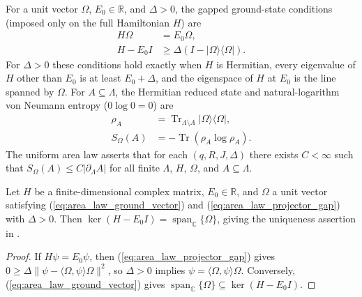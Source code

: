 \begin{definition}
    \label{def:area_law_ground_entropy}
    \leanok
    For a unit vector $\Omega$, $E_0\in\mathbb R$, and $\Delta>0$, the gapped
    ground-state conditions (imposed only on the full Hamiltonian $H$) are
    \begin{align}
        \label{eq:area_law_ground_vector}
        H\Omega & =E_0\Omega,                                \\
        \label{eq:area_law_projector_gap}
        H-E_0I  & \ge\Delta(I-|\Omega\rangle\langle\Omega|).
    \end{align}
    For $\Delta>0$ these conditions hold exactly when $H$ is Hermitian, every
    eigenvalue of $H$ other than $E_0$ is at least $E_0+\Delta$, and the
    eigenspace of $H$ at $E_0$ is the line spanned by $\Omega$.
    For $A\subseteq\Lambda$, the Hermitian reduced state and natural-logarithm
    von Neumann entropy ($0\log0=0$) are
    \begin{align}
        \label{eq:area_law_reduced_state}
        \rho_A      & =\operatorname{Tr}_{\Lambda\setminus A}|\Omega\rangle\langle\Omega|, \\
        \label{eq:area_law_regional_entropy}
        S_\Omega(A) & =-\operatorname{Tr}(\rho_A\log\rho_A).
    \end{align}
    The uniform area law asserts that for each $(q,R,J,\Delta)$ there exists
    $C<\infty$ such that $S_\Omega(A)\le C|\partial_\Lambda A|$ for all finite
    $\Lambda$, $H$, $\Omega$, and $A\subseteq\Lambda$.
\end{definition}

\begin{lemma}
    \label{thm:area_law_ground_eigenspace}
    \leanok
    Let $H$ be a finite-dimensional complex matrix, $E_0\in\mathbb R$, and
    $\Omega$ a unit vector satisfying (\ref{eq:area_law_ground_vector}) and
    (\ref{eq:area_law_projector_gap}) with $\Delta>0$. Then
    $\ker(H-E_0I)=\operatorname{span}_{\mathbb C}\{\Omega\}$, giving the
    uniqueness assertion in \cite[Proposition~4.5]{OpenAI2026AreaLaw}.
\end{lemma}
\begin{proof}\leanok
    If $H\psi=E_0\psi$, then (\ref{eq:area_law_projector_gap}) gives
    $0\ge\Delta\|\psi-\langle\Omega,\psi\rangle\Omega\|^2$, so $\Delta>0$
    implies $\psi=\langle\Omega,\psi\rangle\Omega$. Conversely,
    (\ref{eq:area_law_ground_vector}) gives
    $\operatorname{span}_{\mathbb C}\{\Omega\}\subseteq\ker(H-E_0I)$.
\end{proof}

